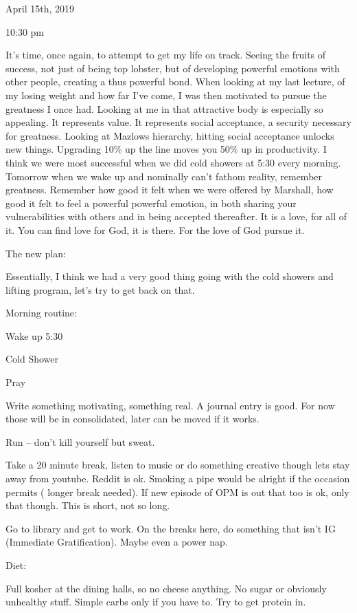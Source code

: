 \bigskip
\bigskip
April 15th, 2019

10:30 pm

It's time, once again, to attempt to get my life on track. Seeing the
fruits of success, not just of being top lobster, but of developing
powerful emotions with other people, creating a thus powerful bond. When
looking at my last lecture, of my losing weight and how far I've come, I
was then motivated to pursue the greatness I once had. Looking at me in
that attractive body is especially so appealing. It represents value. It
represents social acceptance, a security necessary for greatness.
Looking at Mazlows hierarchy, hitting social acceptance unlocks new
things. Upgrading 10\% up the line moves you 50\% up in productivity. I
think we were most successful when we did cold showers at 5:30 every
morning. Tomorrow when we wake up and nominally can't fathom reality,
remember greatness. Remember how good it felt when we were offered by
Marshall, how good it felt to feel a powerful powerful emotion, in both
sharing your vulnerabilities with others and in being accepted
thereafter. It is a love, for all of it. You can find love for God, it
is there. For the love of God pursue it.

The new plan:

Essentially, I think we had a very good thing going with the cold
showers and lifting program, let's try to get back on that.

Morning routine:

Wake up 5:30

Cold Shower

Pray

Write something motivating, something real. A journal entry is good. For
now those will be in consolidated, later can be moved if it works.

Run -- don't kill yourself but sweat.

Take a 20 minute break, listen to music or do something creative though
lets stay away from youtube. Reddit is ok. Smoking a pipe would be
alright if the occasion permits ( longer break needed). If new episode
of OPM is out that too is ok, only that though. This is short, not so
long.

Go to library and get to work. On the breaks here, do something that
isn't IG (Immediate Gratification). Maybe even a power nap.

Diet:

Full kosher at the dining halls, so no cheese anything. No sugar or
obviously unhealthy stuff. Simple carbs only if you have to. Try to get
protein in.

